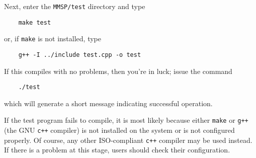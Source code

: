 Next, enter the {\tt MMSP/test} directory and type
\begin{shadebox}
\begin{verbatim}
    make test
\end{verbatim}
\end{shadebox}
or, if {\tt make} is not installed, type
\begin{shadebox}
\begin{verbatim}
    g++ -I ../include test.cpp -o test
\end{verbatim}
\end{shadebox}
If this compiles with no problems, then you're in luck; issue the command
\begin{shadebox}
\begin{verbatim}
    ./test
\end{verbatim}
\end{shadebox}
which will generate a short message indicating successful operation.

If the test program fails to compile, it is most likely because either {\tt make} or {\tt g++} (the GNU {\tt c++} compiler) is not installed on the system or is not configured properly.  Of course, any other ISO-compliant {\tt c++} compiler may be used instead.  If there is a problem at this stage, users should check their configuration.

